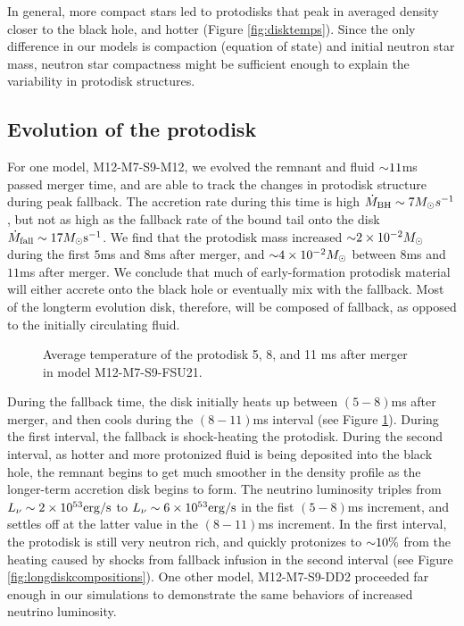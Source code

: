 In general, more compact stars led to protodisks that peak in averaged density closer to the black hole, and hotter (Figure \ref{fig:disktemps}).
Since the only difference in our models is compaction (equation of state) and initial neutron star mass,
neutron star compactness might be sufficient enough to explain the variability in protodisk structures. 

\subsection{Evolution of the protodisk}

For one model, M12-M7-S9-M12, we evolved the remnant and fluid $\mathord{\sim} 11$ms passed merger time, and are able to track the changes in protodisk structure during peak fallback.
The accretion rate during this time is high $\dot{M}_{\rm BH} \sim 7 M_\odot s^{-1}$, but not as high as the fallback rate of the bound tail onto the disk $\dot{M}_{\rm fall} \sim 17 M_\odot {\rm s}^{-1}$.
We find that the protodisk mass increased $\mathord{\sim} 2 \times 10^{-2} M_\odot$ during the first $5$ms and $8$ms after merger, and $\mathord{\sim}4 \times 10^{-2} M_\odot$ between $8$ms and $11$ms after merger.
We conclude that much of early-formation protodisk material will either accrete onto the black hole or eventually mix with the fallback.
Most of the longterm evolution disk, therefore, will be composed of fallback, as opposed to the initially circulating fluid.

\begin{figure}
	\centering
	
	\caption[Average temperature of the protodisks 5, 8, and 11 ms after merger]{
		Average temperature of the protodisk 5, 8, and 11 ms after merger in model M12-M7-S9-FSU21.
	}
	\label{fig:longdisktemperatures}
\end{figure}

During the fallback time, the disk initially heats up between $(5-8)$ms after merger, and then cools during the $(8-11)$ms interval (see Figure \ref{fig:longdisktemperatures}). 
During the first interval, the fallback is shock-heating the protodisk.
During the second interval, 
as hotter and more protonized fluid is being deposited into the black hole,
the remnant begins to get much smoother in the density profile as the longer-term  accretion disk begins to form.
The neutrino luminosity triples from $L_\nu \sim 2\times 10^{53} {\rm erg/s}$ to $L_\nu \sim 6\times 10^{53} {\rm erg/s}$ in the fist $(5-8)$ms increment, and settles off at the latter value in the $(8-11)$ms increment.
In the first interval, the protodisk is still very neutron rich, and quickly protonizes to $\mathord{\sim} 10\%$ from the heating caused by shocks from fallback infusion in the second interval (see Figure \ref{fig:longdiskcompositions}).
One other model, M12-M7-S9-DD2 proceeded far enough in our simulations to demonstrate the same behaviors of increased neutrino luminosity.

